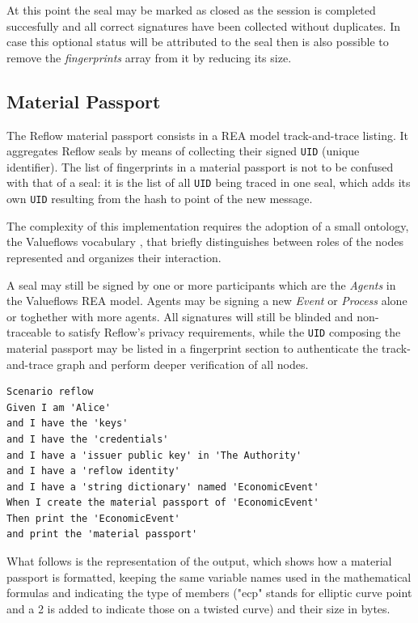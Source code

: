 \documentclass[twocolumn]{article}
\begin{document}
At this point the seal may be marked as closed as the session is
completed succesfully and all correct signatures have been collected
without duplicates. In case this optional status will be attributed to
the seal then is also possible to remove the \emph{fingerprints}
array from it by reducing its size.



\subsection{Material Passport}

The Reflow material passport consists in a REA model track-and-trace
\citep{trackandtrace} listing. It aggregates Reflow seals by means of
collecting their signed \verb!UID! (unique identifier). The list of
fingerprints in a material passport is not to be confused with that of
a seal: it is the list of all \verb!UID! being traced in one seal,
which adds its own \verb!UID! resulting from the hash to point of the
new message.

The complexity of this implementation requires the adoption of a small
ontology, the Valueflows vocabulary \citep{valueflows}, that briefly
distinguishes between roles of the nodes represented and organizes
their interaction.

A seal may still be signed by one or more participants which are the
\emph{Agents} in the Valueflows REA model. Agents may be signing a new
\emph{Event} or \emph{Process} alone or toghether with more agents.
All signatures will still be blinded and non-traceable to satisfy
Reflow's privacy requirements, while the \verb!UID! composing the
material passport may be listed in a fingerprint section to
authenticate the track-and-trace graph and perform deeper verification
of all nodes.

\begin{lstlisting}[style=zencode,caption={Create a new material passport}]
Scenario reflow
Given I am 'Alice'
and I have the 'keys'
and I have the 'credentials'
and I have a 'issuer public key' in 'The Authority'
and I have a 'reflow identity'
and I have a 'string dictionary' named 'EconomicEvent'
When I create the material passport of 'EconomicEvent'
Then print the 'EconomicEvent'
and print the 'material passport'
\end{lstlisting}

What follows is the representation of the output, which shows how a
material passport is formatted, keeping the same variable names used
in the mathematical formulas and indicating the type of members ("ecp"
stands for elliptic curve point and a 2 is added to indicate those on a twisted curve) and their size in bytes.
\end{document}
